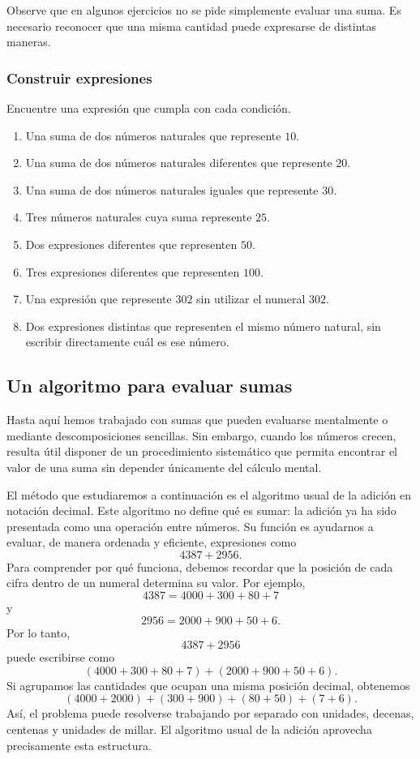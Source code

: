 Observe que en algunos ejercicios no se pide simplemente evaluar una suma. Es necesario reconocer que una misma cantidad puede expresarse de distintas maneras.

\subsubsection*{Construir expresiones}

Encuentre una expresión que cumpla con cada condición.

\begin{enumerate}
\item Una suma de dos números naturales que represente \(10\).

\item Una suma de dos números naturales diferentes que represente \(20\).

\item Una suma de dos números naturales iguales que represente \(30\).

\item Tres números naturales cuya suma represente \(25\).

\item Dos expresiones diferentes que representen \(50\).

\item Tres expresiones diferentes que representen \(100\).

\item Una expresión que represente \(302\) sin utilizar el numeral \(302\).

\item Dos expresiones distintas que representen el mismo número natural, sin escribir directamente cuál es ese número.
\end{enumerate}

\subsection{Un algoritmo para evaluar sumas}

Hasta aquí hemos trabajado con sumas que pueden evaluarse mentalmente o mediante descomposiciones sencillas. Sin embargo, cuando los números crecen, resulta útil disponer de un procedimiento sistemático que permita encontrar el valor de una suma sin depender únicamente del cálculo mental.

El método que estudiaremos a continuación es el algoritmo usual de la adición en notación decimal. Este algoritmo no define qué es sumar: la adición ya ha sido presentada como una operación entre números. Su función es ayudarnos a evaluar, de manera ordenada y eficiente, expresiones como
\[
4387+2956.
\]
Para comprender por qué funciona, debemos recordar que la posición de cada cifra dentro de un numeral determina su valor. Por ejemplo,
\[
4387=4000+300+80+7
\]
y
\[
2956=2000+900+50+6.
\]
Por lo tanto,
\[
4387+2956
\]
puede escribirse como
\[
(4000+300+80+7)+(2000+900+50+6).
\]
Si agrupamos las cantidades que ocupan una misma posición decimal, obtenemos
\[
(4000+2000)+(300+900)+(80+50)+(7+6).
\]
Así, el problema puede resolverse trabajando por separado con unidades, decenas, centenas y unidades de millar. El algoritmo usual de la adición aprovecha precisamente esta estructura.

